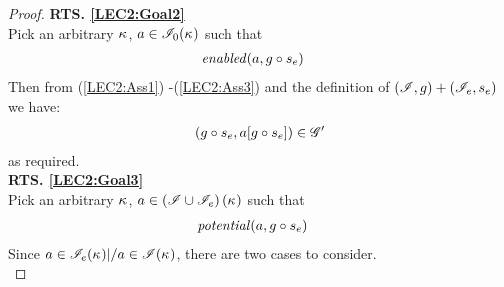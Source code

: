 \begin{lemma}
\begin{proof}
\noindent\textbf{RTS. \ref{LEC2:Goal2}}\\
Pick an arbitrary $\kappa_{}$, $a \in \mathscr{I}_0(\kappa_{})$ such that
%
\begin{align}
	& \mathit{enabled}(a, g \circ s_e) \label{LEC2:Ass20}
\end{align}
Then from (\ref{LEC2:Ass1}) -(\ref{LEC2:Ass3}) and the definition of $(\mathscr{I}, g) + (\mathscr{I}_e, s_e)$ we have:
%
\begin{align*}
	(g \circ s_e, a[g \circ s_e]) \in \mathscr{G}'
\end{align*}
%
as required.\\
%
%
%

\noindent\textbf{RTS. \ref{LEC2:Goal3}}\\
Pick an arbitrary $\kappa_{}$, $a \in \left(\mathscr{I} \cup \mathscr{I}_e\right)(\kappa_{})$ such that
%
\begin{align}
	& \mathit{potential}(a, g \circ s_e)  \label{LEC2:Ass25}
\end{align}
Since $a \in \mathscr{I}_e(\kappa_{}) |/  a \in\mathscr{I}(\kappa_{})$, there are two cases to consider. \\


\end{proof}
\end{lemma}
